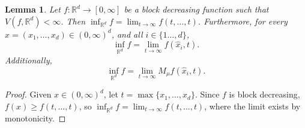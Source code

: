 \documentclass[12pt]{amsart}
\numberwithin{equation}{section}
\theoremstyle{plain}
\newtheorem{lemma}[theorem]{Lemma}
\theoremstyle{definition}
\theoremstyle{remark}
\begin{document}
\begin{lemma}
  \label{varlim1}
  Let $f: \mathbb{R}^d \to [0,\infty]$ be a block decreasing function
   such that
  $V(f,\mathbb{R}^d)<\infty$. Then $\inf_{\mathbb{R}^d} f =
\lim_{t\rightarrow \infty}
  f(t,\ldots,t)$. Furthermore,
for every $x = (x_1,\ldots,x_{d}) \in (0,\infty)^d$, and
all $i\in \{1\dots, d\}$,
  \begin{equation}\label{limites}
    \inf_{\mathbb{R}^d} f =\lim_{t\rightarrow \infty}
f(\hat{x}_i,t).
\end{equation}
Additionally,
\begin{equation}\label{limmax}
    \inf_{\mathbb{R}^d} f = \lim_{t\rightarrow \infty}
M_\mu f(\hat{x}_i,t).
\end{equation}
\end{lemma}

\begin{proof} Given $x  \in (0,\infty)^d$, let $t = \max\{x_1,\ldots,x_{d}\}$. Since $f$ is block decreasing, $f(x) \ge
  f(t,\ldots,t)$, so
  $\inf_{\mathbb{R}^d} f =
\lim_{t\rightarrow \infty}
  f(t,\ldots,t)$, where the limit exists by monotonicity.


\end{proof}
\end{document}
